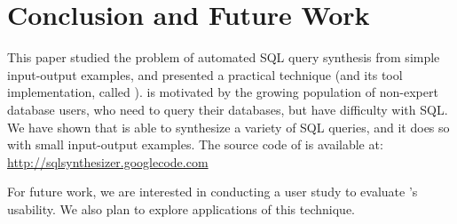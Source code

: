 \section{Conclusion and Future Work}
\label{sec:conclusion}




This paper studied the problem of automated SQL query synthesis
from simple input-output examples, and presented a
practical technique (and its tool implementation, called \ourtool).
\ourtool is motivated by the growing population of
non-expert database users, who need to query their
databases, but have difficulty with SQL.
We have shown that \ourtool is
able to synthesize a variety of SQL queries,
and it does so with small input-output examples.
The source code of \ourtool is available at: 
\url{http://sqlsynthesizer.googlecode.com}


For future work, we are interested in conducting a user study
to evaluate \ourtool's usability. We also plan to explore
applications of this technique.

\vspace{1mm}

\begin{comment}
Our future work will concentrate on the following topics:

\textbf{Enrich the supported SQL subset.} We plan to enrich the
supported SQL subset by \ourtool, and design a corresponding algorithm
to synthesize more general queries.

\textbf{Illustration of synthesis steps.} Besides
producing a final result, end-users may also be interested in knowing
how a SQL query is inferred step by step.
Showing detailed inference steps not
only makes \ourtool more usable, but also permits
end-users to better understand the whole process and
spot possible errors earlier.
We plan to apply recent advance in data visualization~\cite{Kandel:2011}
to the context of program synthesis.

\textbf{Noise detection and tolerance in users' inputs.} The current technique
requires users to provide noise-free input-output examples.
Even in the presence of a small amount of user-input noises (e.g., a typo),
the inference algorithm will declare failure when it fails to learn
a valid SQL query.
To overcome this limitation, we plan to design a more robust inference
algorithm that can attempt to identify and tolerate user-input noises,
and even suggest a fix to the noisy example.

\end{comment}


